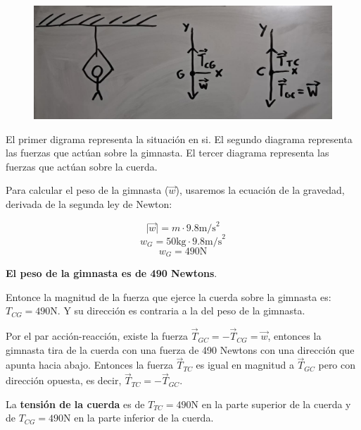 \documentclass{article}
\newcommand{\bl}[1]{\textbf{#1}}
\begin{document}
    \begin{figure}[H]
        \centering
        \includegraphics[width=\textwidth]{img/3.1-1.png}
    \end{figure}

    \par El primer digrama representa la situación en si. El segundo diagrama representa las fuerzas que actúan sobre la gimnasta. El tercer diagrama representa las fuerzas que actúan sobre la cuerda.

    \quad

    \par Para calcular el peso de la gimnasta ($\vec{w}$), usaremos la ecuación de la gravedad, derivada de la segunda ley de Newton:

    \[ \lvert \vec{w} \rvert = m \cdot 9.8 \text{m/s}^2 \]
    \[ w_G = 50 \text{kg} \cdot 9.8 \text{m/s}^2 \]
    \[ w_G = 490 \text{N} \]

    \begin{center}
        \par \bl{El peso de la gimnasta es de 490 Newtons}.
    \end{center}

    \par Entonce la magnitud de la fuerza que ejerce la cuerda sobre la gimnasta es: $T_{CG} = 490 \text{N}$. Y su dirección es contraria a la del peso de la gimnasta.

    \par Por el par acción-reacción, existe la fuerza $\vec{T}_{GC} = - \vec{T}_{CG} = \vec{w}$, entonces la gimnasta tira de la cuerda con una fuerza de 490 Newtons con una dirección que apunta hacia abajo. Entonces la fuerza $\vec{T}_{TC}$ es igual en magnitud a $\vec{T}_{GC}$ pero con dirección opuesta, es decir, $\vec{T}_{TC} = - \vec{T}_{GC}$.

    \quad

    \par La \bl{tensión de la cuerda} es de $T_{TC} = 490 \text{N}$ en la parte superior de la cuerda y de $T_{CG} = 490 \text{N}$ en la parte inferior de la cuerda.
\end{document}
